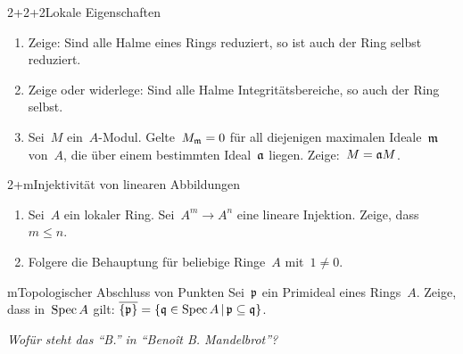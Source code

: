 \documentclass{uebblatt}
\begin{document}
\begin{aufgabe}{2+2+2}{Lokale Eigenschaften}
\begin{enumerate}
\item Zeige: Sind alle Halme eines Rings reduziert, so ist auch der Ring selbst
reduziert.
\item Zeige oder widerlege: Sind alle Halme Integritätsbereiche, so
auch der Ring selbst.
\item Sei~$M$ ein~$A$-Modul. Gelte~$M_{\mathfrak{m}} = 0$ für all diejenigen maximalen
Ideale~$\mathfrak{m}$ von~$A$, die über einem bestimmten Ideal~$\mathfrak{a}$ liegen. Zeige:~$M
= \mathfrak{a} M$.
\end{enumerate}
\end{aufgabe}

\begin{aufgabe}{2+m}{Injektivität von linearen Abbildungen}
\begin{enumerate}
\item Sei~$A$ ein lokaler Ring. Sei~$A^m \to A^n$ eine lineare Injektion.
Zeige, dass~$m \leq n$.
\item Folgere die Behauptung für beliebige Ringe~$A$ mit~$1 \neq 0$.
\end{enumerate}
\end{aufgabe}

\begin{aufgabe}{m}{Topologischer Abschluss von Punkten}
Sei~$\mathfrak{p}$ ein Primideal eines Rings~$A$. Zeige, dass in~$\operatorname{Spec} A$ gilt:
$\overline{\{\mathfrak{p}\}} = \{ \mathfrak{q} \in \operatorname{Spec} A \,|\, \mathfrak{p} \subseteq \mathfrak{q} \}$.
\end{aufgabe}

\centering
\emph{Wofür steht das "`B."' in "`Benoît B. Mandelbrot"'?}
\end{document}
